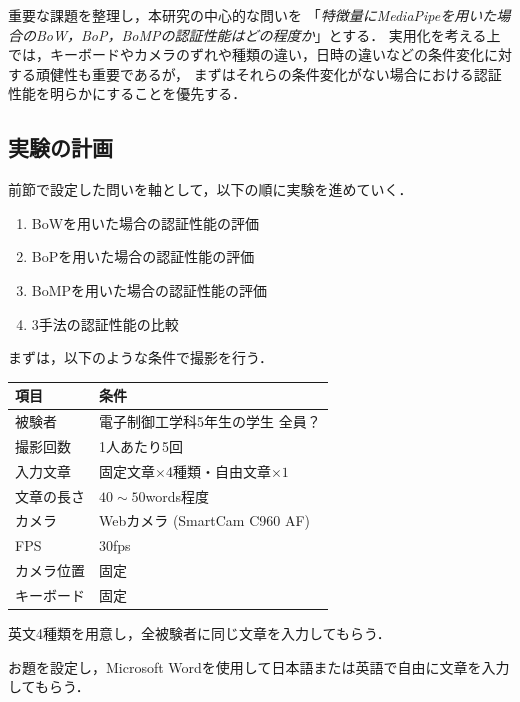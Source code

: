\documentclass[twoside,twocolumn]{ujarticle}
\begin{document}
重要な課題を整理し，本研究の中心的な問いを
「\emph{特徴量にMediaPipeを用いた場合のBoW，BoP，BoMPの認証性能はどの程度か}」とする．
実用化を考える上では，キーボードやカメラのずれや種類の違い，日時の違いなどの条件変化に対する頑健性も重要であるが，
まずはそれらの条件変化がない場合における認証性能を明らかにすることを優先する．

\subsection{実験の計画}

前節で設定した問いを軸として，以下の順に実験を進めていく．
\begin{enumerate}
  \setlength{\parskip}{0cm}
  \setlength{\itemsep}{0cm}
  \item BoWを用いた場合の認証性能の評価
  \item BoPを用いた場合の認証性能の評価
  \item BoMPを用いた場合の認証性能の評価
  \item 3手法の認証性能の比較
\end{enumerate}

まずは，以下のような条件で撮影を行う．
\begin{table}[htbp]
  \setlength{\intextsep}{0cm}    %
  \centering
  \begin{tabular}{ll}
    項目 & 条件 \\
    \hline
    被験者 & 電子制御工学科5年生の学生 全員？ \\
    撮影回数 & 1人あたり5回 \\
    入力文章 & 固定文章$\times$4種類・自由文章$\times1$ \\
    文章の長さ & $40 \sim 50$words程度 \\
    カメラ & Webカメラ (SmartCam C960 AF) \\
    FPS & 30fps \\
    カメラ位置 & 固定 \\
    キーボード & 固定
  \end{tabular}
\end{table}
\begin{description}
  \setlength{\parskip}{0cm}
  \setlength{\itemsep}{0cm}
  \item[固定文章] 英文4種類を用意し，全被験者に同じ文章を入力してもらう．
  \item[自由文章] お題を設定し，Microsoft Wordを使用して日本語または英語で自由に文章を入力してもらう．  
\end{description}
\end{document}
